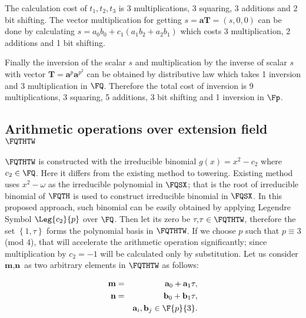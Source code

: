 The calculation cost of $t_1,t_2,t_3$ is 3 multiplications, 3 squaring, 3 additions and 2 bit shifting. The vector multiplication for getting $s = \textbf{aT} =(s,0,0)$ can be done by calculating $s = a_0b_0+c_1(a_1b_2+a_2b_1)$ which costs 3 multiplication, 2 additions and 1 bit shifting. 

Finally the inversion of the scalar $s$ and multiplication by the inverse of scalar $s$ with vector $\textbf{T}= \textbf{a}^p\textbf{a}^{p^2}$ can be obtained by distributive law which takes 1 inversion and 3 multiplication in $\FQ$. Therefore the total cost of inversion is 9 multiplications, 3 squaring, 5 additions, 3 bit shifting and 1 inversion in $\Fp$. 


\subsection{Arithmetic operations over extension field $\FQTHTW$}
$\FQTHTW$ is constructed with the irreducible binomial $g(x)=x^2-c_2$ where $c_2 \in \FQ$. Here it differs from the existing method to towering. Existing method uses $x^2-\omega$ as the irreducible polynomial in $\FQSX$; that is the root of irreducible binomial of $\FQTH$ is used to construct irreducible binomial in $\FQSX$. In this proposed approach, such binomial can be easily obtained by applying Legendre Symbol $\Leg{c_2}{p}$ over $\FQ$. Then let its zero be $\tau$,$\tau \in \FQTHTW$, therefore the set $\left\lbrace 1, \tau \right\rbrace $ forms the polynomial basis in $\FQTHTW$. If we choose $p$ such that $p \equiv 3$ (mod $4$), that will accelerate the arithmetic operation significantly; since multiplication by $c_2=-1$ will be calculated only by substitution. Let us consider $\textbf{m},\textbf{n}$ as two arbitrary elements in $\FQTHTW$ as follows:

\begin{eqnarray}\label{eq:vec_mn_Fp3_2}
\textbf{m} & = & \textbf{a}_0 + \textbf{a}_1\tau,  \nonumber \\ 
\textbf{n} & = & \textbf{b}_0+\textbf{b}_1 \tau,  \nonumber \\
& & \textbf{a}_i, \textbf{b}_j \in \F{p}{3}.  \nonumber
\end{eqnarray} 

